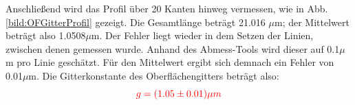 Anschließend wird das Profil über 20 Kanten hinweg vermessen, wie in Abb. \ref{bild:OFGitterProfil} gezeigt. Die Gesamtlänge beträgt 
21.016 $\mu$m; der Mittelwert beträgt also 1.0508$\mu$m. 
Der Fehler liegt wieder in dem Setzen der Linien, zwischen denen gemessen wurde. Anhand des Abmess-Tools wird dieser auf 0.1$\mu$m pro 
Linie geschätzt. Für den Mittelwert ergibt sich demnach ein Fehler von 0.01$\mu$m. Die Gitterkonstante des Oberflächengitters beträgt also:
\begin{equation*}
    \textcolor{red}{g = (1.05 \pm 0.01) \mu m}
\end{equation*}